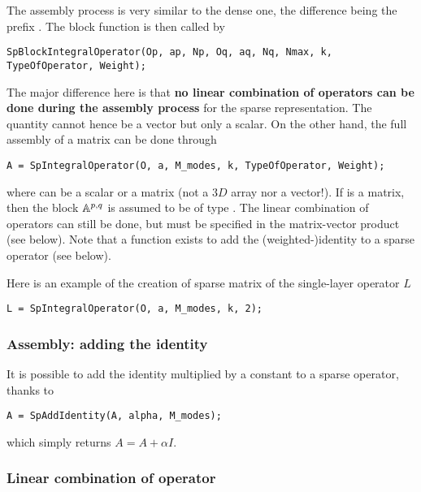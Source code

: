 The assembly process is very similar to the dense one, the difference being the prefix . The block function is then called by
\begin{verbatim}
SpBlockIntegralOperator(Op, ap, Np, Oq, aq, Nq, Nmax, k, TypeOfOperator, Weight);
\end{verbatim}
The major difference here is that \textbf{no linear combination of operators can be done during the assembly process} for the sparse representation. The quantity  cannot hence be a vector but only a scalar. On the other hand, the full assembly of a matrix can be done through
\begin{verbatim}
A = SpIntegralOperator(O, a, M_modes, k, TypeOfOperator, Weight);
\end{verbatim}
where  can be a scalar or a matrix (not a $3D$ array nor a vector!). If  is a matrix, then the block $\mathbb{A}^{p,q}$ is assumed to be of type . The linear combination of operators can still be done, but must be specified in the matrix-vector product (see below). Note that a function exists to add the (weighted-)identity to a sparse operator (see below).

Here is an example of the creation of \mudiff sparse matrix of the single-layer operator $L$
\begin{verbatim}
L = SpIntegralOperator(O, a, M_modes, k, 2);
\end{verbatim}

\subsubsection{Assembly: adding the identity}

It is possible to add the identity multiplied by a constant to a sparse operator, thanks to
\begin{verbatim}
A = SpAddIdentity(A, alpha, M_modes);
\end{verbatim}
which simply returns $A = A+\alpha I$.

\subsubsection{Linear combination of operator}

